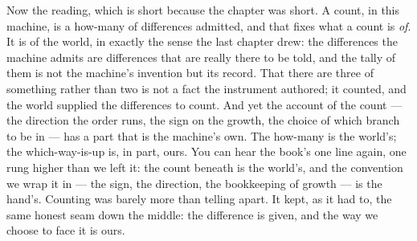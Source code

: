 Now the reading, which is short because the chapter was short. A count, in this machine, is a how-many of
differences admitted, and that fixes what a count is \emph{of}. It is of the world, in exactly the sense the last
chapter drew: the differences the machine admits are differences that are really there to be told, and the tally
of them is not the machine's invention but its record. That there are three of something rather than two is not a
fact the instrument authored; it counted, and the world supplied the differences to count. And yet the account of
the count --- the direction the order runs, the sign on the growth, the choice of which branch to be in --- has a
part that is the machine's own. The how-many is the world's; the which-way-is-up is, in part, ours. You can hear
the book's one line again, one rung higher than we left it: the count beneath is the world's, and the convention
we wrap it in --- the sign, the direction, the bookkeeping of growth --- is the hand's. Counting was barely more
than telling apart. It kept, as it had to, the same honest seam down the middle: the difference is given, and the
way we choose to face it is ours.
